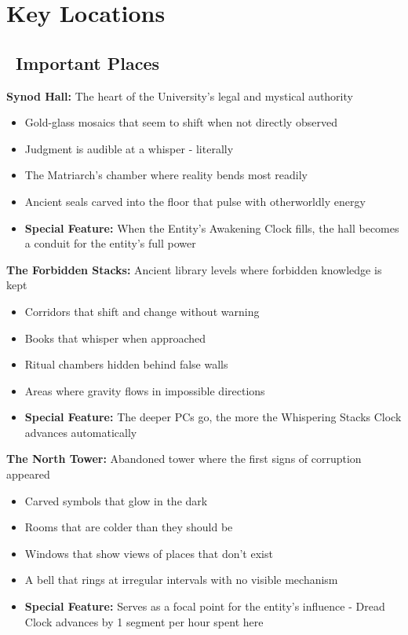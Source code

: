 \documentclass[11pt]{article}
\begin{document}
\section{Key Locations}

\subsection*{\faBuilding\ Important Places}

\textbf{Synod Hall:}
The heart of the University's legal and mystical authority
\begin{itemize}
    \item Gold-glass mosaics that seem to shift when not directly observed
    \item Judgment is audible at a whisper - literally
    \item The Matriarch's chamber where reality bends most readily
    \item Ancient seals carved into the floor that pulse with otherworldly energy
    \item \textbf{Special Feature:} When the Entity's Awakening Clock fills, the hall becomes a conduit for the entity's full power
\end{itemize}

\textbf{The Forbidden Stacks:}
Ancient library levels where forbidden knowledge is kept
\begin{itemize}
    \item Corridors that shift and change without warning
    \item Books that whisper when approached
    \item Ritual chambers hidden behind false walls
    \item Areas where gravity flows in impossible directions
    \item \textbf{Special Feature:} The deeper PCs go, the more the Whispering Stacks Clock advances automatically
\end{itemize}

\textbf{The North Tower:}
Abandoned tower where the first signs of corruption appeared
\begin{itemize}
    \item Carved symbols that glow in the dark
    \item Rooms that are colder than they should be
    \item Windows that show views of places that don't exist
    \item A bell that rings at irregular intervals with no visible mechanism
    \item \textbf{Special Feature:} Serves as a focal point for the entity's influence - Dread Clock advances by 1 segment per hour spent here
\end{itemize}
\end{document}
